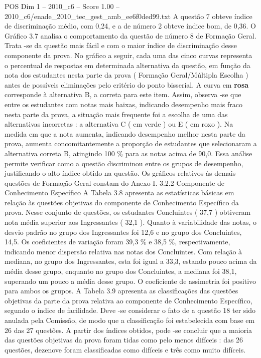 \begin{textsample}{POS Dim 1 – 2010\_c6 – Score 1.00 – 2010\_c6/enade\_2010\_tec\_gest\_amb\_ee6f0ded99.txt}
A questão 7 obteve índice de discriminação médio, com 0,24, e a de número 2 obteve índice bom, de 0,36.
O Gráfico 3.7 analisa o comportamento da questão de número 8 de Formação Geral.
Trata -se da questão mais fácil e com o maior índice de discriminação desse componente da prova.
No gráfico a seguir, cada uma das cinco curvas representa o percentual de respostas em determinada alternativa da questão, em função da nota dos estudantes nesta parte da prova ( Formação Geral/Múltipla Escolha ) antes de possíveis eliminações pelo critério do ponto bisserial.
A curva em \textbf{rosa} corresponde à alternativa B, a correta para este item.
Assim, observa -se que entre os estudantes com notas mais baixas, indicando desempenho mais fraco nesta parte da prova, a situação mais frequente foi a escolha de uma das alternativas incorretas : a alternativa C ( em verde ) ou E ( em roxo ).
Na medida em que a nota aumenta, indicando desempenho melhor nesta parte da prova, aumenta concomitantemente a proporção de estudantes que selecionaram a alternativa correta B, atingindo 100 \% para as notas acima de 90,0.
Essa análise permite verificar como a questão discriminou entre os grupos de desempenho, justificando o alto índice obtido na questão.
Os gráficos relativos às demais questões de Formação Geral constam do Anexo I. 3.2.2 Componente de Conhecimento Específico A Tabela 3.8 apresenta as estatísticas básicas em relação às questões objetivas do componente de Conhecimento Específico da prova.
Nesse conjunto de questões, os estudantes Concluintes ( 37,7 ) obtiveram nota média superior aos Ingressantes ( 32,1 ).
Quanto à variabilidade das notas, o desvio padrão no grupo dos Ingressantes foi 12,6 e no grupo dos Concluintes, 14,5.
Os coeficientes de variação foram 39,3 \% e 38,5 \%, respectivamente, indicando menor dispersão relativa nas notas dos Concluintes.
Com relação à mediana, no grupo dos Ingressantes, esta foi igual a 33,3, estando pouco acima da média desse grupo, enquanto no grupo dos Concluintes, a mediana foi 38,1, superando um pouco a média desse grupo.
O coeficiente de assimetria foi positivo para ambos os grupos.
A Tabela 3.9 apresenta as classificações das questões objetivas da parte da prova relativa ao componente de Conhecimento Específico, segundo o índice de facilidade.
Deve -se considerar o fato de a questão 18 ter sido anulada pela Comissão, de modo que a classificação foi estabelecida com base em 26 das 27 questões.
A partir dos índices obtidos, pode -se concluir que a maioria das questões objetivas da prova foram tidas como pelo menos difíceis : das 26 questões, dezenove foram classificadas como difíceis e três como muito difíceis.

\end{textsample}
